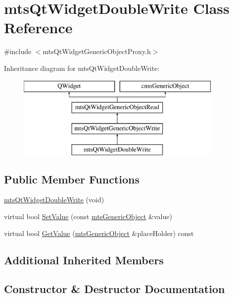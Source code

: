 \hypertarget{classmts_qt_widget_double_write}{}\section{mts\+Qt\+Widget\+Double\+Write Class Reference}
\label{classmts_qt_widget_double_write}


{\ttfamily \#include $<$mts\+Qt\+Widget\+Generic\+Object\+Proxy.\+h$>$}

Inheritance diagram for mts\+Qt\+Widget\+Double\+Write\+:\begin{figure}[H]
\begin{center}
\leavevmode
\includegraphics[height=4.000000cm]{d6/d6b/classmts_qt_widget_double_write}
\end{center}
\end{figure}
\subsection*{Public Member Functions}
\begin{DoxyCompactItemize}
\item 
\hyperlink{classmts_qt_widget_double_write_a03bf91e1df9f22b7f6f8b7f039642b1d}{mts\+Qt\+Widget\+Double\+Write} (void)
\item 
virtual bool \hyperlink{classmts_qt_widget_double_write_a5f386ee1049f6153dcabc94c73f582f2}{Set\+Value} (const \hyperlink{classmts_generic_object}{mts\+Generic\+Object} \&value)
\item 
virtual bool \hyperlink{classmts_qt_widget_double_write_ad22323affe3df5f66bc2db9a86a3c250}{Get\+Value} (\hyperlink{classmts_generic_object}{mts\+Generic\+Object} \&place\+Holder) const 
\end{DoxyCompactItemize}
\subsection*{Additional Inherited Members}


\subsection{Constructor \& Destructor Documentation}
\hypertarget{classmts_qt_widget_double_write_a03bf91e1df9f22b7f6f8b7f039642b1d}{}
